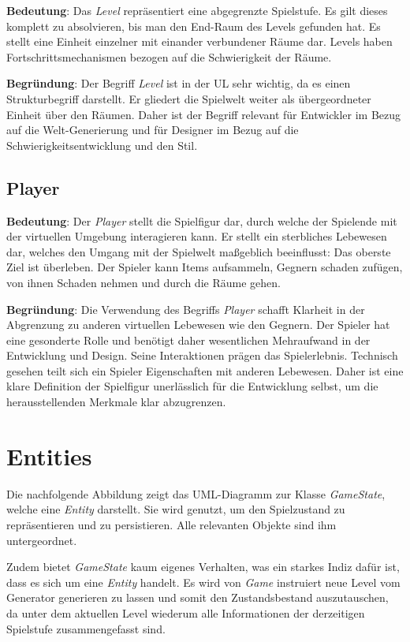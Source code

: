 \textbf{Bedeutung}: Das \textit{Level} repräsentiert eine abgegrenzte
Spielstufe. Es gilt dieses komplett zu absolvieren, bis man den
End-Raum des Levels gefunden hat. Es stellt eine Einheit einzelner mit
einander verbundener Räume dar. Levels haben Fortschrittsmechanismen
bezogen auf die Schwierigkeit der Räume.

\textbf{Begründung}: Der Begriff \textit{Level} ist in der UL sehr
wichtig, da es einen Strukturbegriff darstellt. Er gliedert die
Spielwelt weiter als übergeordneter Einheit über den Räumen. Daher
ist der Begriff relevant für Entwickler im Bezug auf die Welt-Generierung
und für Designer im Bezug auf die Schwierigkeitsentwicklung und den
Stil.



\subsection*{Player}

\textbf{Bedeutung}: Der \textit{Player} stellt die Spielfigur dar,
durch welche der Spielende mit der virtuellen Umgebung interagieren
kann. Er stellt ein sterbliches Lebewesen dar, welches den Umgang mit
der Spielwelt maßgeblich beeinflusst: Das oberste Ziel ist überleben.
Der Spieler kann Items aufsammeln, Gegnern schaden zufügen, von ihnen
Schaden nehmen und durch die Räume gehen.

\textbf{Begründung}: Die Verwendung des Begriffs \textit{Player}
schafft Klarheit in der Abgrenzung zu anderen virtuellen Lebewesen
wie den Gegnern. Der Spieler hat eine gesonderte Rolle und benötigt
daher wesentlichen Mehraufwand in der Entwicklung und Design. Seine
Interaktionen prägen das Spielerlebnis. Technisch gesehen teilt sich
ein Spieler Eigenschaften mit anderen Lebewesen. Daher ist eine klare
Definition der Spielfigur unerlässlich für die Entwicklung selbst, um
die herausstellenden Merkmale klar abzugrenzen.

\section{Entities}
Die nachfolgende Abbildung zeigt das UML-Diagramm zur Klasse
\textit{GameState}, welche eine \textit{Entity} darstellt. Sie wird
genutzt, um den Spielzustand zu repräsentieren und zu persistieren.
Alle relevanten Objekte sind ihm untergeordnet. 

Zudem bietet \textit{GameState} kaum eigenes Verhalten, was ein
starkes Indiz dafür ist, dass es sich um eine \textit{Entity} handelt.
Es wird von \textit{Game} instruiert neue Level vom Generator
generieren zu lassen und somit den Zustandsbestand auszutauschen, da
unter dem aktuellen Level wiederum alle Informationen der derzeitigen
Spielstufe zusammengefasst sind.

